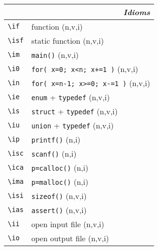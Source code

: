 \documentclass[oneside,10pt,a4paper,DIV24]{scrartcl}
\begin{document}
\begin{center}
\newpage 
\begin{tabular}[]{l}
   \\ [1.0ex]               %
\end{tabular} \\ 
%
\begin{tabular}[]{|p{14mm}|p{58mm}|}
\hline 
\multicolumn{2}{|r|}{\textsl{\textbf{I}dioms}}   \\
\hline \verb'\if'  & function                         \hfill (n,v,i)\\
\hline \verb'\isf' & static function                  \hfill (n,v,i)\\
\hline \verb'\im'  & \verb'main()'                    \hfill (n,v,i)\\
\hline \verb'\i0'  & \verb'for( x=0; x<n; x+=1 )'     \hfill (n,v,i)\\
\hline \verb'\in'  & \verb'for( x=n-1; x>=0; x-=1 )'  \hfill (n,v,i)\\
\hline \verb'\ie'  & \verb'enum'   + \verb'typedef'   \hfill (n,v,i)\\
\hline \verb'\is'  & \verb'struct' + \verb'typedef'   \hfill (n,v,i)\\
\hline \verb'\iu'  & \verb'union'  + \verb'typedef'   \hfill (n,v,i)\\
\hline \verb'\ip'  & \verb'printf()'                  \hfill (n,i)\\
\hline \verb'\isc' & \verb'scanf()'                   \hfill (n,i)\\
\hline \verb'\ica' & \verb'p=calloc()'                \hfill (n,i)\\
\hline \verb'\ima' & \verb'p=malloc()'                \hfill (n,i)\\
\hline \verb'\isi' & \verb'sizeof()'                  \hfill (n,v,i)\\
\hline \verb'\ias' & \verb'assert()'                  \hfill (n,v,i)\\
\hline \verb'\ii'  & open input file                  \hfill (n,v,i)\\
\hline \verb'\io'  & open output file                 \hfill (n,v,i)\\

\end{tabular}
\end{center}
\end{document}
